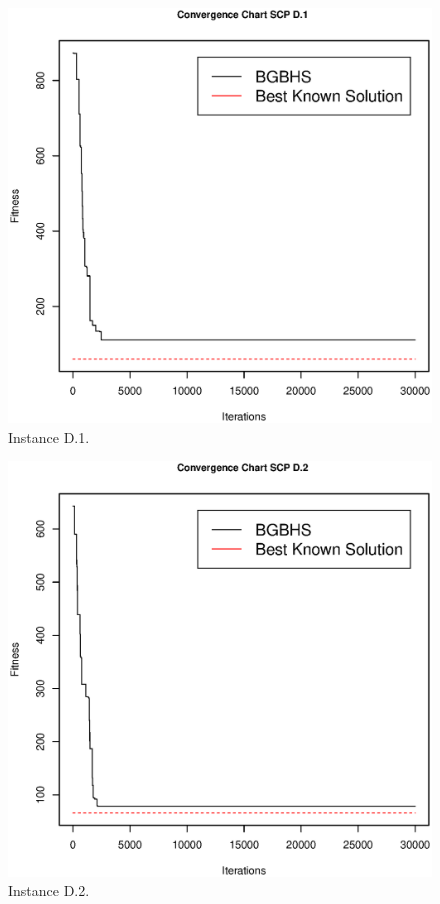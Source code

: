 \begin{figure}[]
\centering
\includegraphics[scale=.45]{Resultados/scpD1.eps}
\caption{Instance D.1.}
\label{fig:Instance.D.1}
\end{figure}

\begin{figure}[]
\centering
\includegraphics[scale=.45]{Resultados/scpD2.eps}
\caption{Instance D.2.}
\label{fig:Instance.D.2}
\end{figure}

